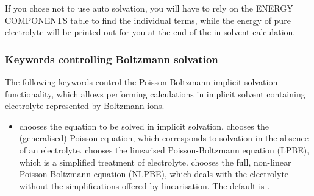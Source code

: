 \documentclass[letterpaper,10pt,english]{sphinxmanual}
\begin{document}
\begin{DUlineblock}{0em}
\item[] 
\item[] If you chose not to use auto solvation, you will have to rely on the
ENERGY COMPONENTS table to find the individual terms, while the energy
of pure electrolyte will be printed out for you at the end of the
in-solvent calculation.
\end{DUlineblock}


\subsubsection{Keywords controlling Boltzmann solvation}
\label{\detokenize{implicit_solvation_v3:keywords-controlling-boltzmann-solvation}}
The following keywords control the Poisson-Boltzmann implicit solvation
functionality, which allows performing calculations in implicit solvent
containing electrolyte represented by Boltzmann ions.
\begin{itemize}
\item {} 
 chooses the equation to be solved in
implicit solvation.  chooses the (generalised) Poisson
equation, which corresponds to solvation in the absence of an
electrolyte.  chooses the linearised Poisson-Boltzmann
equation (LPBE), which is a simplified treatment of electrolyte.
 chooses the full, non-linear Poisson-Boltzmann equation
(NLPBE), which deals with the electrolyte without the simplifications
offered by linearisation. The default is .

\end{itemize}
\end{document}
